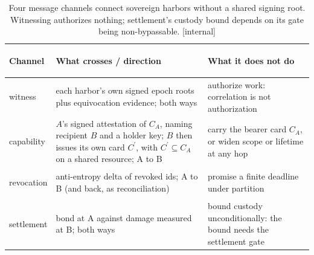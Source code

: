 \begin{table}[H]
\centering
\begin{minipage}{.96\linewidth}
\caption{Four message channels connect sovereign harbors without a shared signing root. Witnessing authorizes nothing; settlement's custody bound depends on its gate being non-bypassable. [internal]}
\label{tab:fh-topology}
\small
\renewcommand{\arraystretch}{1.15}
\begin{tabularx}{\linewidth}{@{}>{\bfseries\raggedright\arraybackslash}p{2cm} >{\raggedright\arraybackslash}X >{\raggedright\arraybackslash}X@{}}
\toprule
Channel & \textbf{What crosses / direction} & \textbf{What it does not do} \\
\midrule
witness & each harbor's own signed epoch roots plus equivocation evidence; both ways & authorize work: correlation is not authorization \\
capability & $A$'s signed attestation of $C_A$, naming recipient $B$ and a holder key; $B$ then issues its own card $C^{\prime}$, with $C^{\prime}\subseteq C_A$ on a shared resource; A to B & carry the bearer card $C_A$, or widen scope or lifetime at any hop \\
revocation & anti-entropy delta of revoked ids; A to B (and back, as reconciliation) & promise a finite deadline under partition \\
settlement & bond at A against damage measured at B; both ways & bound custody unconditionally: the bound needs the settlement gate \\
\bottomrule
\end{tabularx}
\end{minipage}
\end{table}

